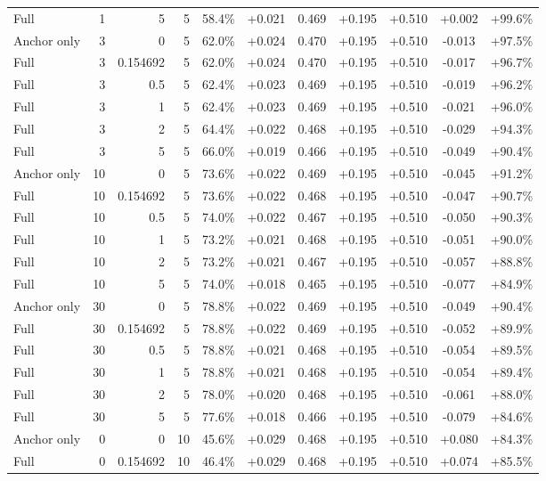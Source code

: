 \begin{table}[htbp]
\begin{tabular}{lrrrccccccc}
Full & 1 & 5 & 5 & 58.4\% & +0.021 & 0.469 & +0.195 & +0.510 & +0.002 & +99.6\% \\
Anchor only & 3 & 0 & 5 & 62.0\% & +0.024 & 0.470 & +0.195 & +0.510 & -0.013 & +97.5\% \\
Full & 3 & 0.154692 & 5 & 62.0\% & +0.024 & 0.470 & +0.195 & +0.510 & -0.017 & +96.7\% \\
Full & 3 & 0.5 & 5 & 62.4\% & +0.023 & 0.469 & +0.195 & +0.510 & -0.019 & +96.2\% \\
Full & 3 & 1 & 5 & 62.4\% & +0.023 & 0.469 & +0.195 & +0.510 & -0.021 & +96.0\% \\
Full & 3 & 2 & 5 & 64.4\% & +0.022 & 0.468 & +0.195 & +0.510 & -0.029 & +94.3\% \\
Full & 3 & 5 & 5 & 66.0\% & +0.019 & 0.466 & +0.195 & +0.510 & -0.049 & +90.4\% \\
Anchor only & 10 & 0 & 5 & 73.6\% & +0.022 & 0.469 & +0.195 & +0.510 & -0.045 & +91.2\% \\
Full & 10 & 0.154692 & 5 & 73.6\% & +0.022 & 0.468 & +0.195 & +0.510 & -0.047 & +90.7\% \\
Full & 10 & 0.5 & 5 & 74.0\% & +0.022 & 0.467 & +0.195 & +0.510 & -0.050 & +90.3\% \\
Full & 10 & 1 & 5 & 73.2\% & +0.021 & 0.468 & +0.195 & +0.510 & -0.051 & +90.0\% \\
Full & 10 & 2 & 5 & 73.2\% & +0.021 & 0.467 & +0.195 & +0.510 & -0.057 & +88.8\% \\
Full & 10 & 5 & 5 & 74.0\% & +0.018 & 0.465 & +0.195 & +0.510 & -0.077 & +84.9\% \\
Anchor only & 30 & 0 & 5 & 78.8\% & +0.022 & 0.469 & +0.195 & +0.510 & -0.049 & +90.4\% \\
Full & 30 & 0.154692 & 5 & 78.8\% & +0.022 & 0.469 & +0.195 & +0.510 & -0.052 & +89.9\% \\
Full & 30 & 0.5 & 5 & 78.8\% & +0.021 & 0.468 & +0.195 & +0.510 & -0.054 & +89.5\% \\
Full & 30 & 1 & 5 & 78.8\% & +0.021 & 0.468 & +0.195 & +0.510 & -0.054 & +89.4\% \\
Full & 30 & 2 & 5 & 78.0\% & +0.020 & 0.468 & +0.195 & +0.510 & -0.061 & +88.0\% \\
Full & 30 & 5 & 5 & 77.6\% & +0.018 & 0.466 & +0.195 & +0.510 & -0.079 & +84.6\% \\
Anchor only & 0 & 0 & 10 & 45.6\% & +0.029 & 0.468 & +0.195 & +0.510 & +0.080 & +84.3\% \\
Full & 0 & 0.154692 & 10 & 46.4\% & +0.029 & 0.468 & +0.195 & +0.510 & +0.074 & +85.5\% \\

\end{tabular}
\end{table}

